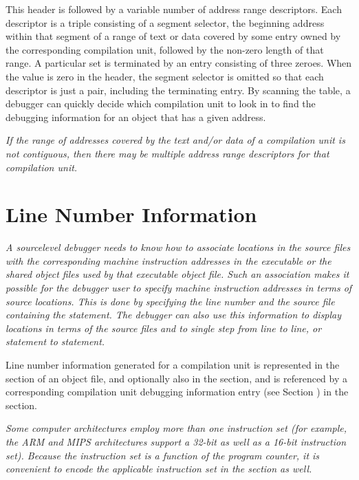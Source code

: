 This header is followed by a variable number of address range
descriptors. Each descriptor is a triple consisting of a
segment selector, the beginning address within that segment
of a range of text or data covered by some entry owned by
the corresponding compilation unit, followed by the non-zero
length of that range. A particular set is terminated by an
entry consisting of three zeroes. 
When the \HFNsegmentselectorsize{} value
is zero in the header, the segment selector is omitted so that
each descriptor is just a pair, including the terminating
entry. By scanning the table, a debugger can quickly decide
which compilation unit to look in to find the debugging
information for an object that has a given address.

\textit{If the range of addresses covered by the text and/or data
of a compilation unit is not contiguous, then there may be
multiple address range descriptors for that compilation unit.}


\section{Line Number Information}
\label{chap:linenumberinformation}
\textit{A source\dash level debugger needs to know how to
associate locations in the source files with the corresponding
machine instruction addresses in the executable or the shared 
object files used by that executable object file. Such an
association makes it possible for the debugger user
to specify machine instruction addresses in terms of source
locations. This is done by specifying the line number
and the source file containing the statement. The debugger
can also use this information to display locations in terms
of the source files and to single step from line to line,
or statement to statement.}

Line number information generated for a compilation unit is
represented in the 
\dotdebugline{} section of an object file, and optionally
also in the \dotdebuglinestr{} section, and
is referenced by a corresponding compilation unit debugging
information entry 
(see Section ) 
in the \dotdebuginfo{} section.

\textit{Some computer architectures employ more than one instruction
set (for example, the ARM 
and 
MIPS architectures support
a 32-bit as well as a 16-bit instruction set). Because the
instruction set is a function of the program counter, it is
convenient to encode the applicable instruction set in the
\dotdebugline{} section as well.}

